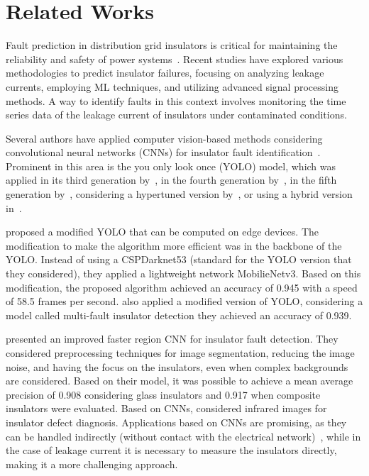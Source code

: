 \section{Related Works}
\label{2}

Fault prediction in distribution grid insulators is critical for maintaining the reliability and safety of power systems~\citep{rocha2019inspection}. Recent studies have explored various methodologies to predict insulator failures, focusing on analyzing leakage currents, employing ML techniques, and utilizing advanced signal processing methods. A way to identify faults in this context involves monitoring the time series data of the leakage current of insulators under contaminated conditions.

Several authors have applied computer vision-based methods considering convolutional neural networks (CNNs)  for insulator fault identification~\citep{9314102}. Prominent in this area is the you only look once (YOLO) model, which was applied in its third generation by~\citet{9866802}, in the fourth generation by~\citet{10012377}, in the fifth generation by~\citet{10106252}, considering a hypertuned version by~\citet{STEFENON2024102722}, or using a hybrid version in~\citep{gtd2.12886}. 

\citet{deng2022research} proposed a modified YOLO that can be computed on edge devices. The modification to make the algorithm more efficient was in the backbone of the YOLO. Instead of using a CSPDarknet53 (standard for the YOLO version that they considered), they applied a lightweight network MobilieNetv3. Based on this modification, the proposed algorithm achieved an accuracy of 0.945 with a speed of 58.5 frames per second. \citet{10298815} also applied a modified version of YOLO, considering a model called multi-fault insulator detection they achieved an accuracy of 0.939. 


\citet{9537742} presented an improved faster region CNN for insulator fault detection. They considered preprocessing techniques for image segmentation, reducing the image noise, and having the focus on the insulators, even when complex backgrounds are considered. Based on their model, it was possible to achieve a mean average precision of 0.908 considering glass insulators and 0.917 when composite insulators were evaluated. Based on CNNs, \citet{10258031} considered infrared images for insulator defect diagnosis. Applications based on CNNs are promising, as they can be handled indirectly (without contact with the electrical network)~\citep{singh2023interpretable}, while in the case of leakage current it is necessary to measure the insulators directly, making it a more challenging approach.


